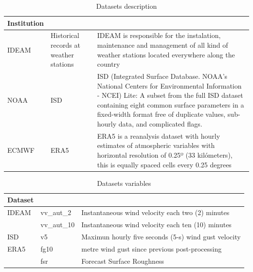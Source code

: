 \documentclass[12pt,oneside]{reedthesis}
\begin{document}
\begingroup\fontsize{10}{12}\selectfont
\begin{longtable}[t]{l>{\raggedright\arraybackslash}p{0.8in}>{\raggedright\arraybackslash}p{4in}}
\caption[Datasets]{\label{tab:tabledatasources1}Datasets description}\\
\toprule
\multicolumn{1}{l}{Institution} & \multicolumn{1}{l}{Dataset} & \multicolumn{1}{l}{Details}\\
\midrule
IDEAM & Historical records at weather stations & IDEAM is responsible for the instalation, maintenance and management of all kind of weather stations located everywhere along the country\\
NOAA & ISD & ISD (Integrated Surface Database. NOAA's National Centers for Environmental Information - NCEI) Lite: A subset from the full ISD dataset containing eight common surface parameters in a fixed-width format free of duplicate values, sub-hourly data, and complicated flags.\\
ECMWF & ERA5 & ERA5 is a reanalysis dataset with hourly estimates of atmospheric variables with horizontal resolution of 0.25º (33 kilómeters), this is equally spaced cells every 0.25 degrees\\
\bottomrule
\end{longtable}
\endgroup{}

\begingroup\fontsize{10}{12}\selectfont
\begin{longtable}[t]{l>{\raggedright\arraybackslash}p{1.2in}>{\raggedright\arraybackslash}p{3.5in}}
\caption[Variables]{\label{tab:tabledatasources2}Datasets variables}\\
\toprule
\multicolumn{1}{l}{Dataset} & \multicolumn{1}{l}{Variables} & \multicolumn{1}{l}{Description}\\
\midrule
IDEAM & vv\_aut\_2 & Instantaneous wind velocity each two (2) minutes\\
 & vv\_aut\_10 & Instantaneous wind velocity each ten (10) minutes\\
ISD & v5 & Maximun hourly five seconds (5-s) wind gust velocity\\
ERA5 & fg10 & 10 metre wind gust since previous post-processing\\
 & fsr & Forecast Surface Roughness\\
\bottomrule
\end{longtable}
\endgroup{}
\end{document}
